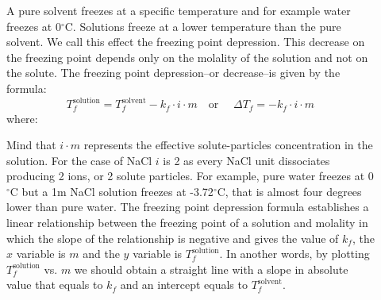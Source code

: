 \documentclass[main.tex]{subfiles}
\newcommand\chapterlabel{Ch-solutions}\setcounter{figurenewcounter}{0}\setcounter{tablenewcounter}{0}\setcounter{formulanewcounter}{0}
\begin{document}
\begin{description}
\item[] 
A pure solvent freezes at a specific temperature and for example water freezes at 0$^{\circ}$C. Solutions freeze at a lower temperature than the pure solvent. We call this effect the freezing point depression. This decrease on the freezing point depends only on the molality of the solution and not on the solute. The freezing point depression--or decrease--is given by the formula:
\begin{equation}
\boxed{ T_f^{\text{solution}}=T_f^{\text{solvent}}-k_f\cdot i\cdot m 	}
\quad  \text{or }\quad 
\boxed{\Delta T_f =-k_f\cdot i\cdot m}
\label{\chapterlabel:equation11}
\end{equation}
where:

Mind that $i\cdot m$ represents the effective solute-particles concentration in the solution. For the case of NaCl $i$ is 2 as every NaCl unit dissociates producing 2 ions, or 2 solute particles.
For example, pure water freezes at 0$^{\circ}$C but a 1m NaCl solution freezes at -3.72$^{\circ}$C, that is almost four degrees lower than pure water.
The freezing point depression formula establishes a linear relationship between the freezing point of a solution and molality in which the slope of the relationship is negative and gives the value of $k_f$, the $x$ variable is $m$ and the $y$ variable is $T_f^{\text{solution}}$. In another words, by plotting $T_f^{\text{solution}}$ vs. $m$ we should obtain a straight line with a slope in absolute value that equals to $k_f$ and an intercept equals to $T_f^{\text{solvent}}$.


\end{description}
\end{document}
